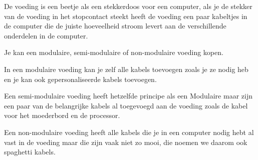 De voeding is een beetje als een stekkerdoos voor een computer, als je de stekker van de voeding in het stopcontact steekt heeft de voeding een paar kabeltjes in de computer die de juiste hoeveelheid stroom levert aan de verschillende onderdelen in de computer.

Je kan een modulaire, semi-modulaire of non-modulaire voeding kopen.

In een modulaire voeding kan je zelf alle kabels toevoegen zoals je ze nodig heb en je kan ook gepersonaliseerde kabels toevoegen.

Een semi-modulaire voeding heeft hetzelfde principe als een Modulaire maar zijn een paar van de belangrijke kabels al toegevoegd aan de voeding zoals de kabel voor het moederbord en de processor.

Een non-modulaire voeding heeft alle kabels die je in een computer nodig hebt al vast in de voeding maar die zijn vaak niet zo mooi, die noemen we daarom ook spaghetti kabels.

